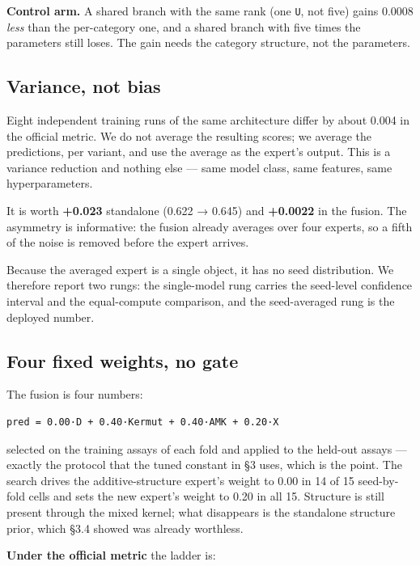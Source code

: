 \documentclass[sigconf,review,nonacm]{acmart}
\begin{document}
\textbf{Control arm.} A shared branch with the same rank (one \texttt{U}, not five) gains 0.0008 \emph{less} than the
per-category one, and a shared branch with five times the parameters still loses. The gain needs the
category structure, not the parameters.

\subsection{Variance, not bias}\label{variance-not-bias}

Eight independent training runs of the same architecture differ by about 0.004 in the official metric.
We do not average the resulting scores; we average the predictions, per variant, and use the average as
the expert's output. This is a variance reduction and nothing else --- same model class, same features,
same hyperparameters.

It is worth \textbf{+0.023} standalone (0.622 → 0.645) and \textbf{+0.0022} in the fusion. The asymmetry is
informative: the fusion already averages over four experts, so a fifth of the noise is removed before
the expert arrives.

Because the averaged expert is a single object, it has no seed distribution. We therefore report two
rungs: the single-model rung carries the seed-level confidence interval and the equal-compute
comparison, and the seed-averaged rung is the deployed number.

\subsection{Four fixed weights, no gate}\label{four-fixed-weights-no-gate}

The fusion is four numbers:

\begin{verbatim}
pred = 0.00·D + 0.40·Kermut + 0.40·AMK + 0.20·X
\end{verbatim}

selected on the training assays of each fold and applied to the held-out assays --- exactly the protocol
that the tuned constant in §3 uses, which is the point. The search drives the additive-structure
expert's weight to 0.00 in 14 of 15 seed-by-fold cells and sets the new expert's weight to 0.20 in all
15. Structure is still present through the mixed kernel; what disappears is the standalone structure
prior, which §3.4 showed was already worthless.

\textbf{Under the official metric} the ladder is:
\end{document}
